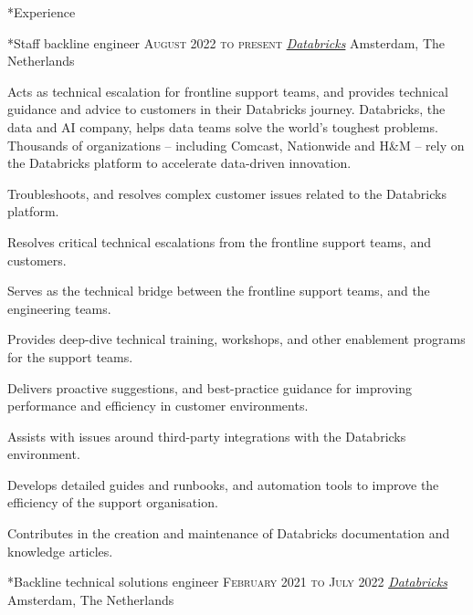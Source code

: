 \documentclass[10pt, a4paper, final]{article}
\begin{document}
\begin{section}*{Experience}
  \begin{subsection}*{Staff backline engineer \hfill\textsc{August 2022 to present}}
    \href{https://databricks.com/}{\textit{Databricks}} \hfill Amsterdam, The Netherlands
    \vspace{1em}

    Acts as technical escalation for frontline support teams, and provides technical guidance and advice to customers in their Databricks journey. Databricks, the data and AI company, helps data teams solve the world's toughest problems. Thousands of organizations -- including Comcast, Nationwide and H{\&}M -- rely on the Databricks platform to accelerate data-driven innovation.
    \vspace{1em}
    \begin{compactitem}
      \item Troubleshoots, and resolves complex customer issues related to the Databricks platform.
      \item Resolves critical technical escalations from the frontline support teams, and customers.
      \item Serves as the technical bridge between the frontline support teams, and the engineering teams.
      \item Provides deep-dive technical training, workshops, and other enablement programs for the support teams.
      \item Delivers proactive suggestions, and best-practice guidance for improving performance and efficiency in customer environments.
      \item Assists with issues around third-party integrations with the Databricks environment.
      \item Develops detailed guides and runbooks, and automation tools to improve the efficiency of the support organisation.
      \item Contributes in the creation and maintenance of Databricks documentation and knowledge articles.
      
    \end{compactitem}
  \end{subsection}
  \vspace{2em}

  \begin{subsection}*{Backline technical solutions engineer \hfill\textsc{February 2021 to July 2022}}
    \href{https://databricks.com/}{\textit{Databricks}} \hfill Amsterdam, The Netherlands
    \vspace{1em}


\end{subsection}
\end{section}
\end{document}
